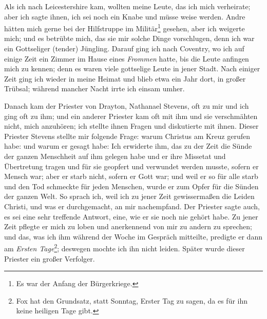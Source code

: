 Als ich nach Leicestershire kam, wollten meine Leute, das ich
mich verheirate; aber ich sagte ihnen, 
ich sei noch ein Knabe und
müsse weise werden. Andre hätten mich gerne bei der Hilfstruppe
im Militär\footnote{Es war der Anfang der Bürgerkriege.}
gesehen, aber ich weigerte mich; und es betrübte mich,
das sie mir solche Dinge vorschlugen, denn ich war ein Gottseliger
(tender) Jüngling. Darauf ging ich nach Coventry, wo ich auf
einige Zeit ein Zimmer im Hause eines \textit{Frommen} hatte, bis
die Leute anfingen mich zu kennen; denn es waren viele gottselige 
Leute in jener Stadt. Nach einiger Zeit ging ich wieder
in meine Heimat und blieb etwa ein Jahr dort, in großer Trübsal; 
während mancher Nacht irrte ich einsam umher.

Danach kam der Priester von Drayton, Nathanael 
Stevens,
oft zu mir und ich ging oft zu ihm; und ein anderer Priester
kam oft mit ihm und sie verschmähten nicht, mich anzuhören; ich
stellte ihnen Fragen und diskutierte mit ihnen. Dieser Priester
Stevens stellte mir folgende Frage: warum Christus am Kreuz
gerufen habe:  
und warum er gesagt habe:  Ich erwiderte ihm, das zu der Zeit die Sünde der
ganzen Menschheit auf ihm gelegen habe und er ihre Missetat
und Übertretung tragen und für sie geopfert und verwundet
werden musste, sofern er Mensch war; aber er starb nicht, sofern
er Gott war; und weil er so für alle starb und den Tod schmeckte
für jeden Menschen, wurde er zum Opfer 
für die Sünden der
ganzen Welt. So sprach ich, weil ich zu jener Zeit gewissermaßen 
die Leiden Christi, und was er durchgemacht, an mir
nachempfand. Der Priester sagte auch, es sei eine sehr treffende
Antwort, eine, wie er sie noch nie gehört habe. Zu jener Zeit
pflegte er mich zu loben und anerkennend von mir zu andern zu
sprechen; und das, was ich ihm während der Woche im Gespräch
mitteilte, predigte er dann am \textit{Ersten Tage}\footnote{Fox 
hat den Grundsatz, statt Sonntag, Erster Tag zu sagen, da es für
ihn keine heiligen Tage gibt.}; deswegen mochte
ich ihn nicht leiden. Später wurde dieser Priester ein großer
Verfolger.

